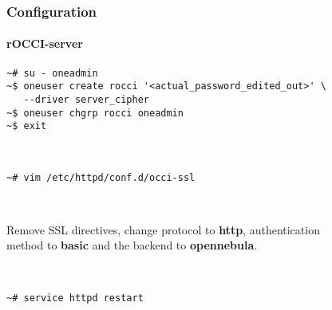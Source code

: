 \begin{frame}[fragile]
  \frametitle{Configuration}
  \framesubtitle{rOCCI-server}

  \begin{Sbox}
  \Fontsmaller
  \begin{minipage}{\linewidth-2\fboxsep-2\fboxrule-4pt}
  \color{white}
  \begin{verbatim}
~# su - oneadmin
~$ oneuser create rocci '<actual_password_edited_out>' \
   --driver server_cipher
~$ oneuser chgrp rocci oneadmin
~$ exit
  \end{verbatim}
  \end{minipage}
  \end{Sbox}

  \hfill \\

  \begin{Sbox}
  \Fontsmaller
  \begin{minipage}{\linewidth-2\fboxsep-2\fboxrule-4pt}
  \color{white}
  \begin{verbatim}
~# vim /etc/httpd/conf.d/occi-ssl
  \end{verbatim}
  \end{minipage}
  \end{Sbox}
  \fcolorbox{black}{black}{\TheSbox}

  \hfill \\

  \begin{center}
    Remove SSL directives, change protocol to \textbf{http}, authentication\\
    method to \textbf{basic} and the backend to \textbf{opennebula}.
  \end{center}

  \hfill \\

  \begin{Sbox}
  \Fontsmaller
  \begin{minipage}{\linewidth-2\fboxsep-2\fboxrule-4pt}
  \color{white}
  \begin{verbatim}
~# service httpd restart
  \end{verbatim}
  \end{minipage}
  \end{Sbox}
\end{frame}
